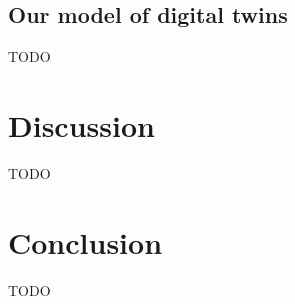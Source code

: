 \documentclass[conference]{IEEEtran}
\begin{document}





    \subsection{Our model of digital twins}
    \label{section:theory-twin}
    TODO

    \section{Discussion}
    \label{section:discussion}
    TODO

    \section{Conclusion}
    \label{section:conclusion}
    TODO
    
    
    
    
\end{document}
